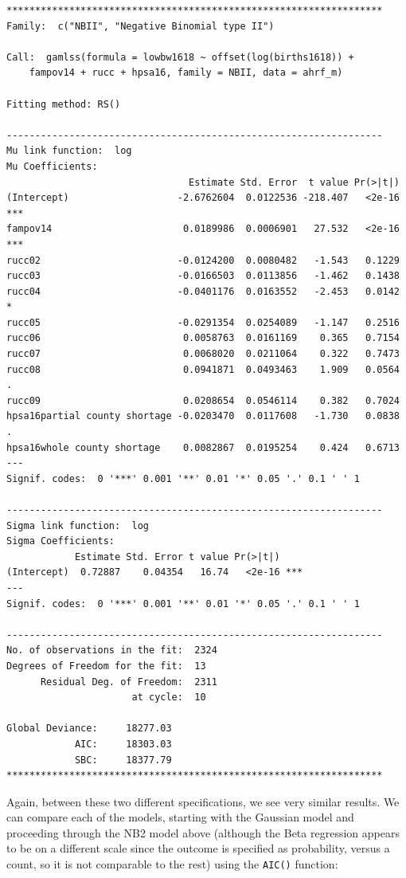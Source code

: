 \documentclass[
  letterpaper,
  DIV=11,
  numbers=noendperiod]{scrreprt}
\begin{document}
\begin{verbatim}
******************************************************************
Family:  c("NBII", "Negative Binomial type II") 

Call:  gamlss(formula = lowbw1618 ~ offset(log(births1618)) +  
    fampov14 + rucc + hpsa16, family = NBII, data = ahrf_m) 

Fitting method: RS() 

------------------------------------------------------------------
Mu link function:  log
Mu Coefficients:
                                Estimate Std. Error  t value Pr(>|t|)    
(Intercept)                   -2.6762604  0.0122536 -218.407   <2e-16 ***
fampov14                       0.0189986  0.0006901   27.532   <2e-16 ***
rucc02                        -0.0124200  0.0080482   -1.543   0.1229    
rucc03                        -0.0166503  0.0113856   -1.462   0.1438    
rucc04                        -0.0401176  0.0163552   -2.453   0.0142 *  
rucc05                        -0.0291354  0.0254089   -1.147   0.2516    
rucc06                         0.0058763  0.0161169    0.365   0.7154    
rucc07                         0.0068020  0.0211064    0.322   0.7473    
rucc08                         0.0941871  0.0493463    1.909   0.0564 .  
rucc09                         0.0208654  0.0546114    0.382   0.7024    
hpsa16partial county shortage -0.0203470  0.0117608   -1.730   0.0838 .  
hpsa16whole county shortage    0.0082867  0.0195254    0.424   0.6713    
---
Signif. codes:  0 '***' 0.001 '**' 0.01 '*' 0.05 '.' 0.1 ' ' 1

------------------------------------------------------------------
Sigma link function:  log
Sigma Coefficients:
            Estimate Std. Error t value Pr(>|t|)    
(Intercept)  0.72887    0.04354   16.74   <2e-16 ***
---
Signif. codes:  0 '***' 0.001 '**' 0.01 '*' 0.05 '.' 0.1 ' ' 1

------------------------------------------------------------------
No. of observations in the fit:  2324 
Degrees of Freedom for the fit:  13
      Residual Deg. of Freedom:  2311 
                      at cycle:  10 
 
Global Deviance:     18277.03 
            AIC:     18303.03 
            SBC:     18377.79 
******************************************************************
\end{verbatim}

Again, between these two different specifications, we see very similar
results. We can compare each of the models, starting with the Gaussian
model and proceeding through the NB2 model above (although the Beta
regression appears to be on a different scale since the outcome is
specified as probability, versus a count, so it is not comparable to the
rest) using the \texttt{AIC()} function:
\end{document}
